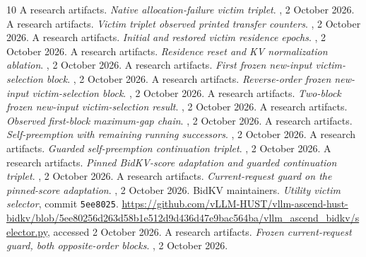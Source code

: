 \documentclass[10pt]{article}
\begin{document}
\begin{thebibliography}{10}
 A research artifacts. \emph{Native allocation-failure victim triplet}. , 2 October 2026.
 A research artifacts. \emph{Victim triplet observed printed transfer counters}. , 2 October 2026.
 A research artifacts. \emph{Initial and restored victim residence epochs}. , 2 October 2026.
 A research artifacts. \emph{Residence reset and KV normalization ablation}. , 2 October 2026.
 A research artifacts. \emph{First frozen new-input victim-selection block}. , 2 October 2026.
 A research artifacts. \emph{Reverse-order frozen new-input victim-selection block}. , 2 October 2026.
 A research artifacts. \emph{Two-block frozen new-input victim-selection result}. , 2 October 2026.
 A research artifacts. \emph{Observed first-block maximum-gap chain}. , 2 October 2026.
 A research artifacts. \emph{Self-preemption with remaining running successors}. , 2 October 2026.
 A research artifacts. \emph{Guarded self-preemption continuation triplet}. , 2 October 2026.
 A research artifacts. \emph{Pinned BidKV-score adaptation and guarded continuation triplet}. , 2 October 2026.
 A research artifacts. \emph{Current-request guard on the pinned-score adaptation}. , 2 October 2026.
 BidKV maintainers. \emph{Utility victim selector}, commit \texttt{5ee8025}. \url{https://github.com/vLLM-HUST/vllm-ascend-hust-bidkv/blob/5ee80256d263d58b1e512d9d436d47e9bac564ba/vllm_ascend_bidkv/selector.py}, accessed 2 October 2026.
 A research artifacts. \emph{Frozen current-request guard, both opposite-order blocks}. , 2 October 2026.

\end{thebibliography}
\end{document}
